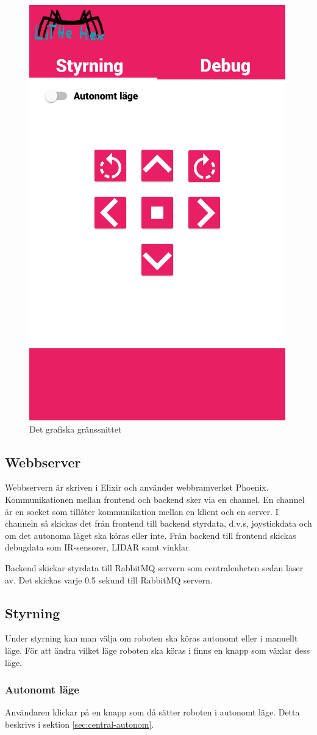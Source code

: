 \documentclass[a4paper,titlepage,12pt]{article}
\begin{document}
	\begin{figure}[h]
		\centering
		\includegraphics[width=0.5\linewidth]{images/gui-index.png}
		\caption{Det grafiska gränssnittet\label{fig:gui-overview}}
	\end{figure}

	\subsection{Webbserver}
	Webbservern är skriven i Elixir och använder webbramverket Phoenix.
    Kommunikationen mellan frontend och backend sker via en channel. En channel
    är en socket som tillåter kommunikation mellan en klient och en server. I
    channeln så skickas det från frontend till backend styrdata, d.v.s,
    joystickdata och om det autonoma läget ska köras eller inte. Från backend
    till frontend skickas debugdata som IR-sensorer, LIDAR samt vinklar.
	
	Backend skickar styrdata till RabbitMQ servern som centralenheten sedan
	läser av. Det skickas varje 0.5 sekund till RabbitMQ servern.

    \subsection{Styrning}
    Under styrning kan man välja om roboten ska köras autonomt eller i manuellt läge.
    För att ändra vilket läge roboten ska köras i finns en knapp som växlar dess läge.
    
    \subsubsection{Autonomt läge}
    Användaren klickar på en knapp som då sätter roboten i autonomt läge. Detta beskrivs i sektion \ref{sec:central-autonom}.
    
\end{document}
